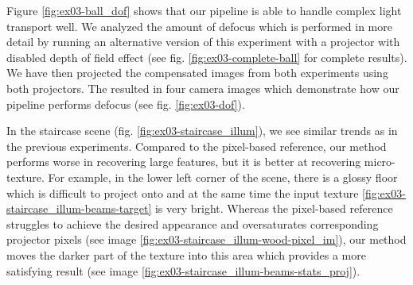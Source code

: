 Figure \ref{fig:ex03-ball_dof} shows that our pipeline is able to handle complex light transport well. We analyzed the amount of defocus which is performed in more detail by running an alternative version of this experiment with a projector with disabled depth of field effect (see fig. \ref{fig:ex03-complete-ball} for complete results). We have then projected the compensated images from both experiments using both projectors. The resulted in four camera images which demonstrate how our pipeline performs defocus (see fig. \ref{fig:ex03-dof}).

In the staircase scene (fig. \ref{fig:ex03-staircase_illum}), we see similar trends as in the previous experiments. Compared to the pixel-based reference, our method performs worse in recovering large features, but it is better at recovering micro-texture. For example, in the lower left corner of the scene, there is a glossy floor which is difficult to project onto and at the same time the input texture \ref{fig:ex03-staircase_illum-beams-target} is very bright. Whereas the pixel-based reference struggles to achieve the desired appearance and oversaturates corresponding projector pixels (see image \ref{fig:ex03-staircase_illum-wood-pixel_im}), our method moves the darker part of the texture into this area which provides a more satisfying result (see image \ref{fig:ex03-staircase_illum-beams-stats_proj}).